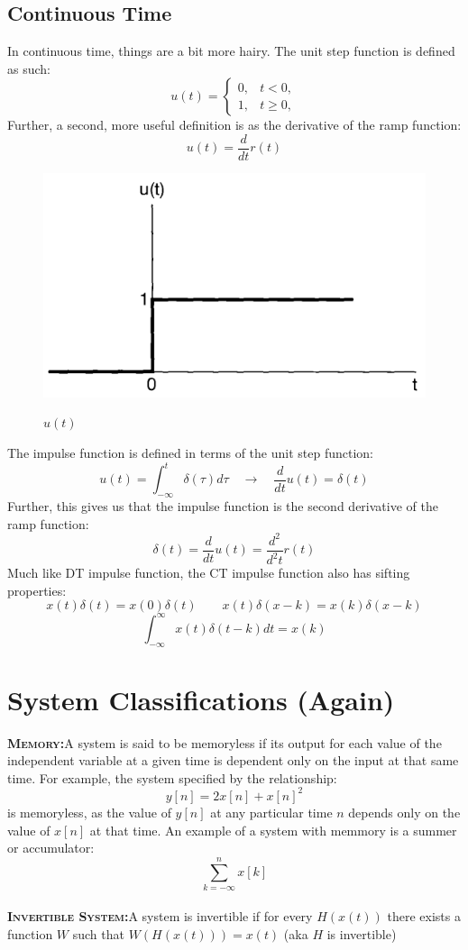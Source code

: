 \documentclass[a4paper,12pt]{article}
\newcommand{\define}[2]{\label{#1}\textbf{\textsc{#1:}}\quad#2\\}
\begin{document}
\subsection{Continuous Time}
In continuous time, things are a bit more hairy.
The unit step function is defined as such:
$$u(t)=\begin{cases} 0, & t < 0, \\ 1, & t \ge 0, \end{cases}$$ 
Further, a second, more useful definition is as the derivative of the ramp function:
$$u(t) = \frac{d}{dt}r(t)$$
\begin{figure}[ht]
	\centering
	\includegraphics[width=.5\textwidth]{ctUnitStep}
	\label{ctUnitStep}
	\caption{$u(t)$}
\end{figure}
The impulse function is defined in terms of the unit step function:
$$u(t)=\int_{-\infty}^t \delta(\tau) d\tau\quad\rightarrow\quad \frac{d}{dt}u(t)=\delta(t)$$
Further, this gives us that the impulse function is the second derivative of the ramp function:
$$\delta(t)=\frac{d}{dt}u(t)=\frac{d^2}{d^2t}r(t)$$
Much like DT impulse function, the CT impulse function also has sifting properties:
$$x(t)\delta(t)=x(0)\delta(t) \qquad x(t)\delta(x-k)=x(k)\delta(x-k)$$
$$\int_{-\infty}^\infty x(t)\delta(t-k) dt = x(k)$$
\section{System Classifications (Again)}
\define{Memory}{A system is said to be memoryless if its output for each value of the independent variable at a given time is dependent only on the input at that same time. For example, the system specified by the relationship:
$$y[n]=2x[n]+x[n]^2$$
is memoryless, as the value of $y[n]$ at any particular time $n$ depends only on the value of $x[n]$ at that time.
An example of a system with memmory is a summer or accumulator:
$$\sum_{k=-\infty}^nx[k]$$}

\define{Invertible System}{A system is invertible if for every $H(x(t))$ there exists a function $W$ such that $W(H(x(t)))=x(t)$ (aka $H$ is invertible)}
\end{document}
